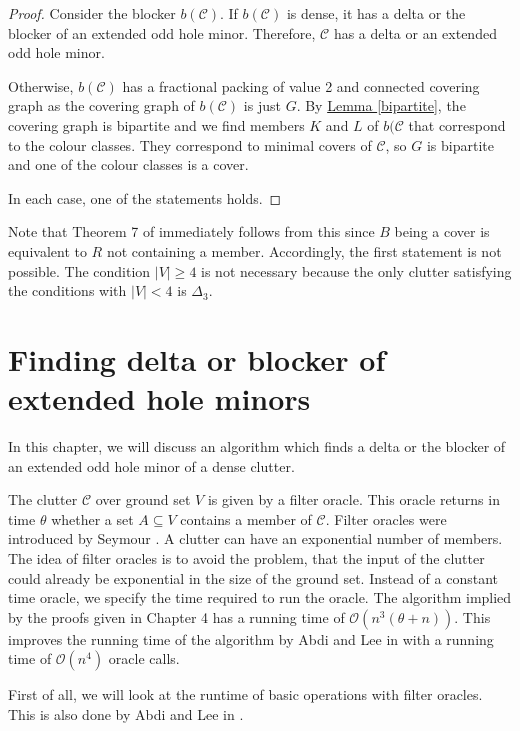 \documentclass[a4paper, 12pt]{scrbook}
\theoremstyle{definition}
\begin{document}
   \begin{proof}
       Consider the blocker $b(\mathcal{C})$.
       If $b(\mathcal{C})$ is dense, it has a delta or the blocker of an extended odd hole minor.
       Therefore, $\mathcal{C}$ has a delta or an extended odd hole minor.

       Otherwise, $b(\mathcal{C})$ has a fractional packing of value 2 and connected covering graph as the covering graph of $b(\mathcal{C})$ is just $G$.
       By \hyperref[bipartite]{Lemma \ref*{bipartite}}, the covering graph is bipartite and we find members $K$ and $L$ of $b(\mathcal{C}$ that correspond to the colour classes. They correspond to minimal covers of $\mathcal{C}$, so $G$ is bipartite and one of the colour classes is a cover.

       In each case, one of the statements holds.
   \end{proof}

   Note that Theorem 7 of \cite{deltas} immediately follows from this since $B$ being a cover is equivalent to $R$ not containing a member. Accordingly, the first statement is not possible. The condition $|V|\geq 4$ is not necessary because the only clutter satisfying the conditions with $|V|<4$ is $\Delta_3$.

   \chapter{Finding delta or blocker of extended hole minors}
   In this chapter, we will discuss an algorithm which finds a delta or the blocker of an extended odd hole minor of a dense clutter.

   The clutter $\mathcal{C}$ over ground set $V$ is given by a filter oracle.
   This oracle returns in time $\theta$ whether a set $A \subseteq V$ contains a member of $\mathcal{C}$.
   Filter oracles were introduced by Seymour \cite{seymour}.
   A clutter can have an exponential number of members.
   The idea of filter oracles is to avoid the problem, that the input of the clutter could already be exponential in the size of the ground set. Instead of a constant time oracle, we specify the time required to run the oracle.
   The algorithm implied by the proofs given in Chapter 4 has a running time of $\mathcal{O}(n^3(\theta+n))$.
   This improves the running time of the algorithm by Abdi and Lee in \cite{deltas} with a running time of $\mathcal{O}(n^4)$ oracle calls.


   First of all, we will look at the runtime of basic operations with filter oracles. This is also done by Abdi and Lee in \cite{deltas}.
\end{document}
